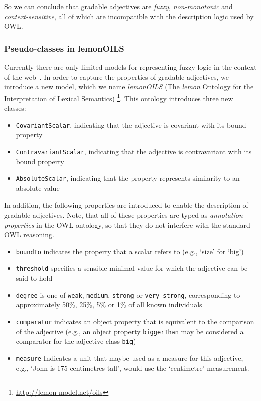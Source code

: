 \documentclass[11pt]{article}
\begin{document}
So we can conclude that gradable adjectives are \emph{fuzzy}, \emph{non-monotonic} 
and \emph{context-sensitive}, all of which are incompatible with the description 
logic used by OWL.

\subsubsection{Pseudo-classes in lemonOILS}

Currently there are only limited models for representing fuzzy 
logic in the context of the web~\cite{zhao2008uncertainty}. In order to capture the 
properties of gradable adjectives, we introduce a new model, which we name 
\emph{lemonOILS} (The \emph{lemon} Ontology for the Interpretation of Lexical Semantics)
\footnote{\url{http://lemon-model.net/oils}}. This ontology introduces three 
new classes:

\begin{itemize}[noitemsep]
	\item {\tt CovariantScalar}, indicating that the adjective is covariant with its bound property
	\item {\tt ContravariantScalar}, indicating that the adjective is contravariant with its bound property
	\item {\tt AbsoluteScalar}, indicating that the property represents similarity to an absolute value
\end{itemize}

In addition, the following properties are introduced to enable the description 
of gradable adjectives. Note, that all of these properties are typed as 
\emph{annotation properties} in the OWL ontology, so that they do not interfere 
with the standard OWL reasoning.

\begin{itemize}[noitemsep]
	\item {\tt boundTo} indicates the property that a scalar refers to (e.g., `size' for `big')
	\item {\tt threshold} specifies a sensible minimal value for which the adjective can be said to hold
	\item {\tt degree} is one of {\tt weak}, {\tt medium}, {\tt strong} or {\tt very strong}, corresponding to approximately 50\%, 25\%, 5\% or 1\% of all known individuals
	\item {\tt comparator} indicates an object property that is equivalent to the comparison of the adjective (e.g., an object property {\tt biggerThan} may be considered a comparator for the adjective class {\tt big})
	\item {\tt measure} Indicates a unit that maybe used as a measure for this adjective, e.g., `John is 175 centimetres tall', would use the `centimetre' measurement.
\end{itemize}
\end{document}
